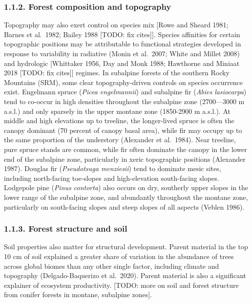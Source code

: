 \documentclass[
  12pt,
]{article}
\begin{document}
\subsubsection{1.1.2. Forest composition and
topography}\label{forest-composition-and-topography}

Topography may also exert control on species mix {[}Rowe and Sheard
1981; Barnes et al.~1982; Bailey 1988 {[}TODO: fix cites{]}{]}. Species
affinities for certain topographic positions may be attributable to
functional strategies developed in response to variability in radiative
(Monin et al.~2007; White and Millet 2008) and hydrologic {[}Whittaker
1956, Day and Monk 1988; Hawthorne and Miniaat 2018 {[}TODO: fix
cites{]}{]} regimes. In subalpine forests of the southern Rocky
Mountains (SRM), some clear topography-driven controls on species
occurrence exist. Engelmann spruce (\emph{Picea engelmannii}) and
subalpine fir (\emph{Abies lasiocarpa}) tend to co-occur in high
densities throughout the subalpine zone (2700---3000 m a.s.l.) and only
sparsely in the upper montane zone (1850-2900 m a.s.l.). At middle and
high elevations up to treeline, the longer-lived spruce is often the
canopy dominant (70 percent of canopy basal area), while fir may occupy
up to the same proportion of the understory (Alexander et al.~1984).
Near treeline, pure spruce stands are common, while fir often dominate
the canopy in the lower end of the subalpine zone, particularly in xeric
topographic positions (Alexander 1987). Douglas fir (\emph{Pseudotsuga
menziesii}) tend to dominate mesic sites, including north-facing
toe-slopes and high-elevation south-facing slopes. Lodgepole pine
(\emph{Pinus contorta}) also occurs on dry, southerly upper slopes in
the lower range of the subalpine zone, and abundantly throughout the
montane zone, particularly on south-facing slopes and steep slopes of
all aspects (Veblen 1986).

\subsubsection{1.1.3. Forest structure and
soil}\label{forest-structure-and-soil}

Soil properties also matter for structural development. Parent material
in the top 10 cm of soil explained a greater share of variation in the
abundance of trees across global biomes than any other single factor,
including climate and topography (Delgado-Baquerizo et al.~2020). Parent
material is also a significant explainer of ecosystem productivity.
{[}TODO: more on soil and forest structure from conifer forests in
montane, subalpine zones{]}.
\end{document}
